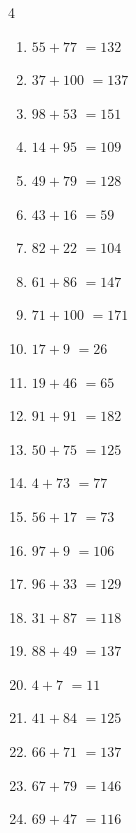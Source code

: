 \begin{multicols}{4}
\begin{enumerate}
  \item $55+77$
        $=132$

  \item $37+100$
        $=137$

  \item $98+53$
        $=151$

  \item $14+95$
        $=109$

  \item $49+79$
        $=128$

  \item $43+16$
        $=59$

  \item $82+22$
        $=104$

  \item $61+86$
        $=147$

  \item $71+100$
        $=171$

  \item $17+9$
        $=26$

  \item $19+46$
        $=65$

  \item $91+91$
        $=182$

  \item $50+75$
        $=125$

  \item $4+73$
        $=77$

  \item $56+17$
        $=73$

  \item $97+9$
        $=106$

  \item $96+33$
        $=129$

  \item $31+87$
        $=118$

  \item $88+49$
        $=137$

  \item $4+7$
        $=11$

  \item $41+84$
        $=125$

  \item $66+71$
        $=137$

  \item $67+79$
        $=146$

  \item $69+47$
        $=116$


\end{enumerate}
\end{multicols}
